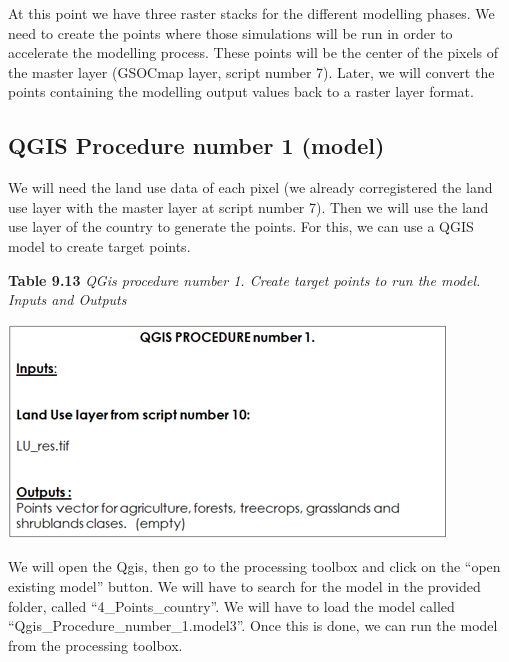 \documentclass[
  10pt,
  b5paper,
]{book}
\begin{document}
At this point we have three raster stacks for the different modelling phases. We need to create the points where those simulations will be run in order to accelerate the modelling process. These points will be the center of the pixels of the master layer (GSOCmap layer, script number 7). Later, we will convert the points containing the modelling output values back to a raster layer format.

\hypertarget{qgis-procedure-number-1-model}{%
\subsection{QGIS Procedure number 1 (model)}\label{qgis-procedure-number-1-model}}

We will need the land use data of each pixel (we already corregistered the land use layer with the master layer at script number 7). Then we will use the land use layer of the country to generate the points. For this, we can use a QGIS model to create target points.

\textbf{Table 9.13} \emph{QGis procedure number 1. Create target points to run the model. Inputs and Outputs}

\includegraphics{tables/Table_9.12.png}

We will open the Qgis, then go to the processing toolbox and click on the ``open existing model'' button. We will have to search for the model in the provided folder, called ``4\_Points\_country''. We will have to load the model called ``Qgis\_Procedure\_number\_1.model3''. Once this is done, we can run the model from the processing toolbox.
\end{document}
